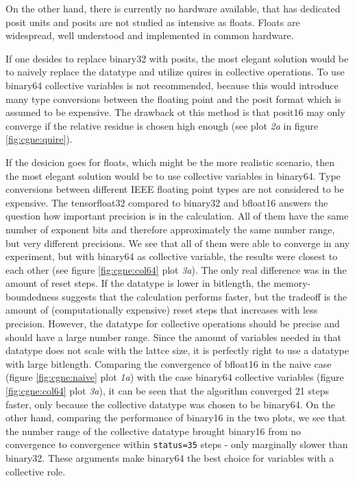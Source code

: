 \documentclass{article}
\theoremstyle{plain} %
\theoremstyle{remark} %
\def\code#1{\texttt{#1}}
\numberwithin{equation}{section}
\begin{document}
On the other hand, there is currently no hardware available, that has dedicated posit units and posits are not studied as intensive as floats. Floats are widespread, well understood and implemented in common hardware.

If one desides to replace \gls{binary32} with posits, the most elegant solution would be to naively replace the datatype and utilize \glspl{quire} in collective operations. To use \gls{binary64} collective variables is not recommended, because this would introduce many type conversions between the floating point and the posit format which is assumed to be expensive. The drawback ot this method is that \gls{posit16} may only converge if the relative residue is chosen high enough (see plot \textit{2a} in figure \ref{fig:cgne:quire}).

If the desicion goes for floats, which might be the more realistic scenario, then the most elegant solution would be to use collective variables in \gls{binary64}. Type conversions between different IEEE floating point types are not considered to be expensive. The \gls{tensorfloat32} compared to \gls{binary32} and \gls{bfloat16} answers the question how important precision is in the calculation. All of them have the same number of exponent bits and therefore approximately the same number range, but very different precisions. We see that all of them were able to converge in any experiment, but with \gls{binary64} as collective variable, the results were closest to each other (see figure \ref{fig:cgne:col64} plot \textit{3a}). The only real difference was in the amount of reset steps. If the datatype is lower in bitlength, the memory-boundedness suggests that the calculation performs faster, but the tradeoff is the amount of (computationally expensive) reset steps that increases with less precision. However, the datatype for collective operations should be precise and should have a large number range. Since the amount of variables needed in that datatype does not scale with the lattce size, it is perfectly right to use a datatype with large bitlength. Comparing the convergence of \gls{bfloat16} in the naive case (figure \ref{fig:cgne:naive} plot \textit{1a}) with the case \gls{binary64} collective variables (figure \ref{fig:cgne:col64} plot \textit{3a}), it can be seen that the algorithm converged \num{21} steps faster, only because the collective datatype was chosen to be \gls{binary64}. On the other hand, comparing the performance of \gls{binary16} in the two plots, we see that the number range of the collective datatype brought \gls{binary16} from no convergence to convergence within \code{status=35} steps - only marginally slower than \gls{binary32}. These arguments make \gls{binary64} the best choice for variables with a collective role.
\end{document}
